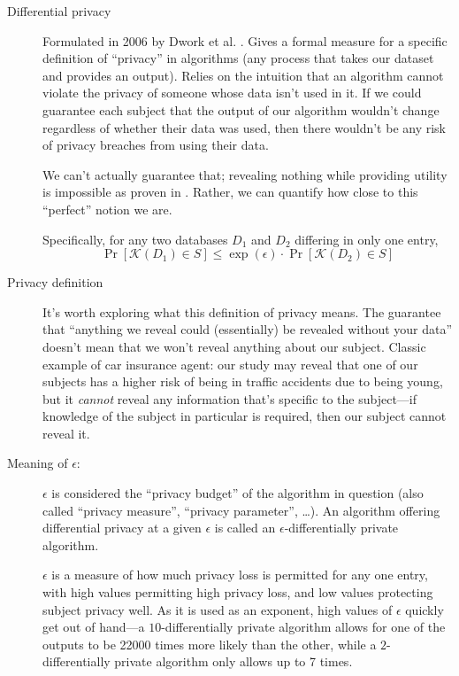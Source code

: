\documentclass[12pt]{article}
\newcommand{\fancy}{\mathcal}
\begin{document}
\begin{description}
    \item[Differential privacy] Formulated in 2006 by Dwork et al. \cite{dworketal2006}. Gives a formal measure for a specific definition of ``privacy'' in algorithms (any process that takes our dataset and provides an output). Relies on the intuition that an algorithm cannot violate the privacy of someone whose data isn't used in it. If we could guarantee each subject that the output of our algorithm wouldn't change regardless of whether their data was used, then there wouldn't be any risk of privacy breaches from using their data.
    
    We can't actually guarantee that; revealing nothing while providing utility is impossible as proven in \cite{dwork2006_diffpriv}. Rather, we can quantify how close to this ``perfect'' notion we are.
    
    Specifically, for any two databases $D_1$ and $D_2$ differing in only one entry,
    \begin{equation}
        \Pr[\fancy{K}(D_1) \in S] \leq \exp(\epsilon) \cdot \Pr[\fancy{K}(D_2) \in S]
    \end{equation}
    
    \item[Privacy definition] It's worth exploring what this definition of privacy means. The guarantee that ``anything we reveal could (essentially) be revealed without your data'' doesn't mean that we won't reveal anything about our subject. Classic example of car insurance agent: our study may reveal that one of our subjects has a higher risk of being in traffic accidents due to being young, but it \emph{cannot} reveal any information that's specific to the subject---if knowledge of the subject in particular is required, then our subject cannot reveal it.
    
    \item[Meaning of $\epsilon$:] $\epsilon$ is considered the ``privacy budget'' of the algorithm in question (also called ``privacy measure'', ``privacy parameter'', \dots). An algorithm offering differential privacy at a given $\epsilon$ is called an $\epsilon$-differentially private algorithm.
    
    $\epsilon$ is a measure of how much privacy loss is permitted for any one entry, with high values permitting high privacy loss, and low values protecting subject privacy well. As it is used as an exponent, high values of $\epsilon$ quickly get out of hand---a $10$-differentially private algorithm allows for one of the outputs to be 22000 times more likely than the other, while a $2$-differentially private algorithm only allows up to 7 times.
    

\end{description}
\end{document}
